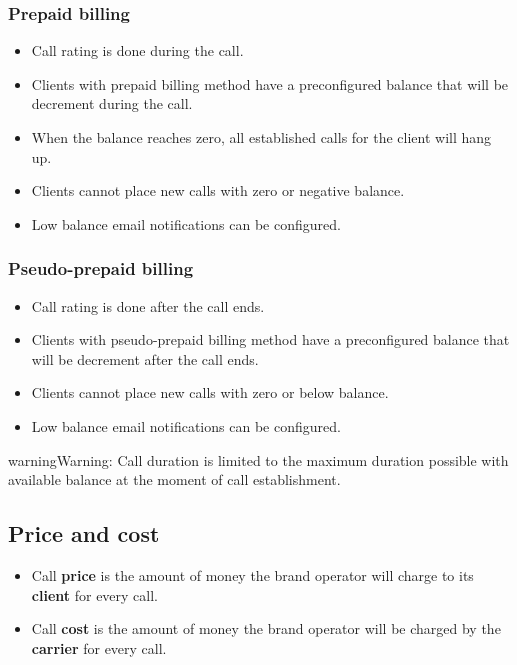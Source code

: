 \documentclass[letterpaper,10pt,english]{sphinxmanual}
\begin{document}
\subsubsection{Prepaid billing}
\label{administration_portal/brand/billing/index:prepaid-billing}\begin{itemize}
\item {} 
Call rating is done during the call.

\item {} 
Clients with prepaid billing method have a preconfigured balance that will be decrement during the call.

\item {} 
When the balance reaches zero, all established calls for the client will hang up.

\item {} 
Clients cannot place new calls with zero or negative balance.

\item {} 
Low balance email notifications can be configured.

\end{itemize}


\subsubsection{Pseudo-prepaid billing}
\label{administration_portal/brand/billing/index:pseudo-prepaid-billing}\begin{itemize}
\item {} 
Call rating is done after the call ends.

\item {} 
Clients with pseudo-prepaid billing method have a preconfigured balance that will be decrement after the call ends.

\item {} 
Clients cannot place new calls with zero or below balance.

\item {} 
Low balance email notifications can be configured.

\end{itemize}

\begin{notice}{warning}{Warning:}
Call duration is limited to the maximum duration possible with available balance at the moment of call establishment.
\end{notice}


\subsection{Price and cost}
\label{administration_portal/brand/billing/index:price-and-cost}\begin{itemize}
\item {} 
Call \textbf{price} is the amount of money the brand operator will charge to its \textbf{client} for every call.

\item {} 
Call \textbf{cost} is the amount of money the brand operator will be charged by the \textbf{carrier} for every call.

\end{itemize}
\end{document}
